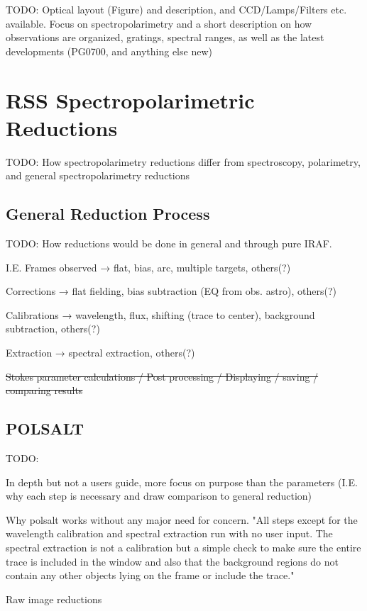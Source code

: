 TODO: Optical layout (Figure) and description, and CCD/Lamps/Filters etc. available. Focus on spectropolarimetry and a short description on how observations are organized, gratings, spectral ranges, as well as the latest developments (PG0700, and anything else new)
\prgph

\section{RSS Spectropolarimetric Reductions} %

TODO: How spectropolarimetry reductions differ from spectroscopy, polarimetry, and general spectropolarimetry reductions

\subsection{General Reduction Process} %

TODO: How reductions would be done in general and through pure IRAF.

I.E. Frames observed → flat, bias, arc, multiple targets, others(?)

Corrections → flat fielding, bias subtraction (EQ from obs. astro), others(?)

Calibrations → wavelength, flux, shifting (trace to center), background subtraction, others(?)

Extraction → spectral extraction, others(?)

\sout{Stokes parameter calculations / Post processing / Displaying / saving / comparing results}

\subsection{POLSALT} %

TODO:

In depth but not a users guide, more focus on purpose than the parameters (I.E. why each step is necessary and draw comparison to general reduction)

Why polsalt works without any major need for concern. "All steps except for the wavelength calibration and spectral extraction run with no user input. The spectral extraction is not a calibration but a simple check to make sure the entire trace is included in the window and also that the background regions do not contain any other objects lying on the frame or include the trace."

\noindent Raw image reductions

